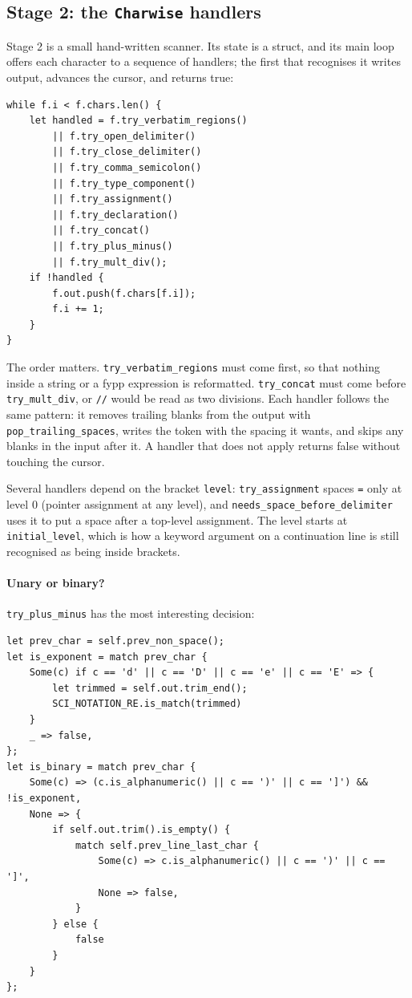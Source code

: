 \documentclass[11pt,a4paper,openany]{book}
\newcommand{\code}[1]{\texttt{\small #1}}
\begin{document}
\subsection{Stage 2: the \texttt{Charwise} handlers}

Stage 2 is a small hand-written scanner. Its state is a struct, and its main
loop offers each character to a sequence of handlers; the first that recognises
it writes output, advances the cursor, and returns true:

\begin{lstlisting}[style=rust]
while f.i < f.chars.len() {
    let handled = f.try_verbatim_regions()
        || f.try_open_delimiter()
        || f.try_close_delimiter()
        || f.try_comma_semicolon()
        || f.try_type_component()
        || f.try_assignment()
        || f.try_declaration()
        || f.try_concat()
        || f.try_plus_minus()
        || f.try_mult_div();
    if !handled {
        f.out.push(f.chars[f.i]);
        f.i += 1;
    }
}
\end{lstlisting}

The order matters. \code{try\_verbatim\_regions} must come first, so that
nothing inside a string or a fypp expression is reformatted.
\code{try\_concat} must come before \code{try\_mult\_div}, or \code{//} would be
read as two divisions. Each handler follows the same pattern: it removes
trailing blanks from the output with \code{pop\_trailing\_spaces}, writes the
token with the spacing it wants, and skips any blanks in the input after it.
A handler that does not apply returns false without touching the cursor.

Several handlers depend on the bracket \code{level}: \code{try\_assignment}
spaces \code{=} only at level 0 (pointer assignment at any level), and
\code{needs\_space\_before\_delimiter} uses it to put a space after a
top-level assignment. The level starts at \code{initial\_level}, which is
how a keyword argument on a continuation line is still recognised as being
inside brackets.

\paragraph{Unary or binary?} \code{try\_plus\_minus} has the most interesting
decision:

\begin{lstlisting}[style=rust]
let prev_char = self.prev_non_space();
let is_exponent = match prev_char {
    Some(c) if c == 'd' || c == 'D' || c == 'e' || c == 'E' => {
        let trimmed = self.out.trim_end();
        SCI_NOTATION_RE.is_match(trimmed)
    }
    _ => false,
};
let is_binary = match prev_char {
    Some(c) => (c.is_alphanumeric() || c == ')' || c == ']') && !is_exponent,
    None => {
        if self.out.trim().is_empty() {
            match self.prev_line_last_char {
                Some(c) => c.is_alphanumeric() || c == ')' || c == ']',
                None => false,
            }
        } else {
            false
        }
    }
};
\end{lstlisting}
\end{document}
